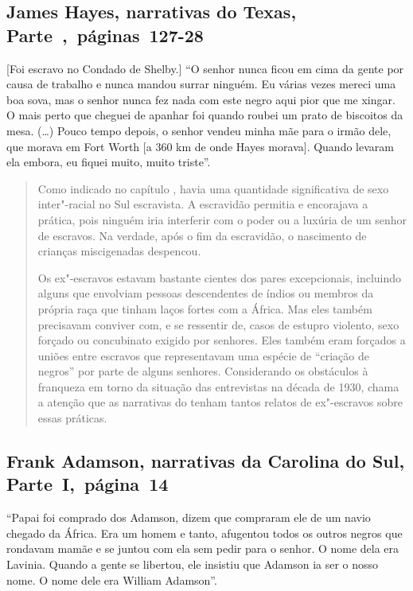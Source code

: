 \subsection{James Hayes, narrativas do Texas, Parte~,~páginas~127-28}
\label{ref130}

{[}Foi escravo no Condado de Shelby.{]} ``O senhor nunca ficou em cima da gente por causa de trabalho e nunca
mandou surrar ninguém. Eu várias vezes mereci uma boa sova, mas o senhor
nunca fez nada com este negro aqui pior que me xingar. O mais perto que
cheguei de apanhar foi quando roubei um prato de biscoitos da mesa.
(\ldots{}) Pouco tempo depois, o senhor vendeu minha mãe para o irmão
dele, que morava em Fort Worth {[}a 360 km de onde Hayes morava{]}.
Quando levaram ela embora, eu fiquei muito, muito triste''.

\begin{quote}
Como indicado no capítulo , havia uma quantidade significativa de
sexo inter"-racial no Sul escravista. A escravidão permitia e encorajava
a prática, pois ninguém iria interferir com o poder ou a luxúria de um
senhor de escravos. Na verdade, após o fim da escravidão, o nascimento
de crianças miscigenadas despencou.

Os ex"-escravos estavam bastante cientes dos pares excepcionais,
incluindo alguns que envolviam pessoas descendentes de índios ou membros
da própria raça que tinham laços fortes com a África. Mas eles também
precisavam conviver com, e se ressentir de, casos de estupro violento,
sexo forçado ou concubinato exigido por senhores. Eles também eram
forçados a uniões entre escravos que representavam uma espécie de
``criação de negros'' por parte de alguns senhores. Considerando os
obstáculos à franqueza em torno da situação das entrevistas na década de
1930, chama a atenção que as narrativas do  tenham tantos relatos de
ex"-escravos sobre essas práticas.
\end{quote}

\subsection{Frank Adamson, narrativas da Carolina do Sul, Parte~I,~página~14} \label{ref05}

``Papai foi comprado dos Adamson, dizem que compraram ele de um navio
chegado da África. Era um homem e tanto, afugentou todos os outros
negros que rondavam mamãe e se juntou com ela sem pedir para o senhor. O
nome dela era Lavinia. Quando a gente se libertou, ele insistiu que
Adamson ia ser o nosso nome. O nome dele era William Adamson''.

